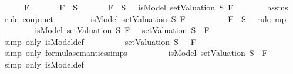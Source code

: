 \begin{isabellebody}
\ \ \ \ \isamarkupfalse%
\ F\isanewline
\ \ \ \ \isamarkupfalse%
\ {\isachardoublequoteopen}\isactrlbold {\isasymnot}\ F\ {\isasymin}\ S{\isachardoublequoteclose}\isanewline
\ \ \ \ \isamarkupfalse%
\ {\isachardoublequoteopen}\isactrlbold {\isasymnot}\ F\ {\isasymin}\ S\ {\isasymlongrightarrow}\ {\isasymnot}\ isModel\ {\isacharparenleft}setValuation\ S{\isacharparenright}\ F{\isachardoublequoteclose}\isanewline
\ \ \ \ \ \ \isamarkupfalse%
\ assms{\isacharparenleft}{}{\isacharparenright}\ \isamarkupfalse%
\ {\isacharparenleft}rule\ conjunct{}{\isacharparenright}\isanewline
\ \ \ \ \isamarkupfalse%
\ \isamarkupfalse%
\ {\isachardoublequoteopen}{\isasymnot}\ isModel\ {\isacharparenleft}setValuation\ S{\isacharparenright}\ F{\isachardoublequoteclose}\isanewline
\ \ \ \ \ \ \isamarkupfalse%
\ \ {\isacartoucheopen}\isactrlbold {\isasymnot}\ F\ {\isasymin}\ S{\isacartoucheclose}\ \isamarkupfalse%
\ {\isacharparenleft}rule\ mp{\isacharparenright}\isanewline
\ \ \ \ \isamarkupfalse%
\ \isamarkupfalse%
\ {\isachardoublequoteopen}{\isacharparenleft}{\isasymnot}\ isModel\ {\isacharparenleft}setValuation\ S{\isacharparenright}\ F{\isacharparenright}\ {\isacharequal}\ {\isacharparenleft}{\isasymnot}\ {\isacharparenleft}setValuation\ S{\isacharparenright}\ {\isasymTurnstile}\ F{\isacharparenright}{\isachardoublequoteclose}\isanewline
\ \ \ \ \ \ \isamarkupfalse%
\ {\isacharparenleft}simp\ only{\isacharcolon}\ isModel{\isacharunderscore}def{\isacharparenright}\isanewline
\ \ \ \ \isamarkupfalse%
\ \isamarkupfalse%
\ {\isachardoublequoteopen}{\isasymdots}\ {\isacharequal}\ setValuation\ S\ {\isasymTurnstile}\ {\isacharparenleft}\isactrlbold {\isasymnot}\ F{\isacharparenright}{\isachardoublequoteclose}\isanewline
\ \ \ \ \ \ \isamarkupfalse%
\ {\isacharparenleft}simp\ only{\isacharcolon}\ formula{\isacharunderscore}semantics{\isachardot}simps{\isacharparenleft}{}{\isacharparenright}{\isacharparenright}\isanewline
\ \ \ \ \isamarkupfalse%
\ \isamarkupfalse%
\ {\isachardoublequoteopen}{\isasymdots}\ {\isacharequal}\ isModel\ {\isacharparenleft}setValuation\ S{\isacharparenright}\ {\isacharparenleft}\isactrlbold {\isasymnot}\ F{\isacharparenright}{\isachardoublequoteclose}\isanewline
\ \ \ \ \ \ \isamarkupfalse%
\ {\isacharparenleft}simp\ only{\isacharcolon}\ isModel{\isacharunderscore}def{\isacharparenright}\isanewline

\end{isabellebody}
